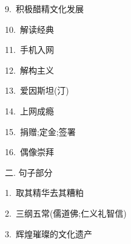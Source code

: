 \documentclass[a4paper, 12pt]{article}
\begin{document}
\begin{multicols}{2}
\begin{flushleft}
9.\ 积极醋精文化发展 \ \ \ \ \underline{\hspace{3cm}}
\end{flushleft}

\begin{flushleft}
10.\ 解读经典 \ \ \ \ \underline{\hspace{3cm}}
\end{flushleft}
\end{multicols}

\begin{multicols}{2}
\begin{flushleft}
11.\ 手机入网 \ \ \ \ \underline{\hspace{3cm}}
\end{flushleft}

\begin{flushleft}
12.\ 解构主义 \ \ \ \ \underline{\hspace{3cm}}
\end{flushleft}
\end{multicols}

\begin{multicols}{2}
\begin{flushleft}
13.\ 爱因斯坦(汀) \ \ \ \ \underline{\hspace{3cm}}
\end{flushleft}

\begin{flushleft}
14.\ 上网成瘾 \ \ \ \ \underline{\hspace{3cm}}
\end{flushleft}
\end{multicols}

\begin{multicols}{2}
\begin{flushleft}
15.\ 捐赠;定金;签署 \ \ \ \ \underline{\hspace{3cm}}
\end{flushleft}

\begin{flushleft}
16.\ 偶像崇拜 \ \ \ \ \underline{\hspace{3cm}}
\end{flushleft}
\end{multicols}

\begin{flushleft}
二. 句子部分
\end{flushleft}

\begin{flushleft}
1.\ 取其精华去其糟粕

\underline{\hspace{16cm}}
\end{flushleft}

\begin{flushleft}
2.\ 三纲五常(儒道佛;仁义礼智信)

\underline{\hspace{16cm}}
\end{flushleft}

\begin{flushleft}
3.\ 辉煌璀璨的文化遗产

\underline{\hspace{16cm}}
\end{flushleft}
\end{document}
